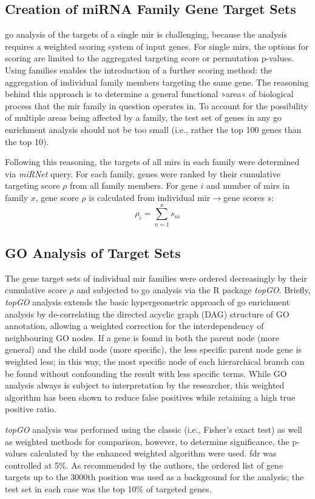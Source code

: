 \subsection{Creation of miRNA Family Gene Target Sets}
\ac{go} analysis of the targets of a single \ac{mir} is challenging, because the analysis requires a weighted scoring system of input genes. For single \acp{mir}, the options for scoring are limited to the aggregated targeting score or permutation p-values. Using families enables the introduction of a further scoring method: the aggregation of individual family members targeting the same gene. The reasoning behind this approach is to determine a general functional »area« of biological process that the \ac{mir} family in question operates in. To account for the possibility of multiple areas being affected by a family, the test set of genes in any \ac{go} enrichment analysis should not be too small (i.e., rather the top 100 genes than the top 10). 

Following this reasoning, the targets of all \acp{mir} in each family were determined via \textit{miRNet} query. For each family, genes were ranked by their cumulative targeting score $\rho$ from all family members. For gene $i$ and number of \acp{mir} in family $x$, gene score $\rho$ is calculated from individual \ac{mir}$\to$gene scores $s$: $$\rho_{i} = \sum_{n=1}^{x} s_{ni}$$

\begin{method}

\subsection{GO Analysis of Target Sets}
The gene target sets of individual \ac{mir} families were ordered decreasingly by their cumulative score $\rho$ and subjected to \ac{go} analysis via the R package \textit{topGO}\cite{Alexa2006}. Briefly, \textit{topGO} analysis extends the basic hypergeometric approach of \ac{go} enrichment analysis by de-correlating the directed acyclic graph (DAG) structure of GO annotation, allowing a weighted correction for the interdependency of neighbouring GO nodes. If a gene is found in both the parent node (more general) and the child node (more specific), the less specific parent node gene is weighted less; in this way, the most specific node of each hierarchical branch can be found without confounding the result with less specific terms. While GO analysis always is subject to interpretation by the researcher, this weighted algorithm has been shown to reduce false positives while retaining a high true positive ratio.

\textit{topGO} analysis was performed using the classic (i.e., Fisher's exact test) as well as weighted methods for comparison, however, to determine significance, the p-values calculated by the enhanced weighted algorithm were used. \ac{fdr} was controlled at 5\%. As recommended by the authors, the ordered list of gene targets up to the 3000th position was used as a background for the analysis; the test set in each case was the top 10\% of targeted genes.

\end{method}

